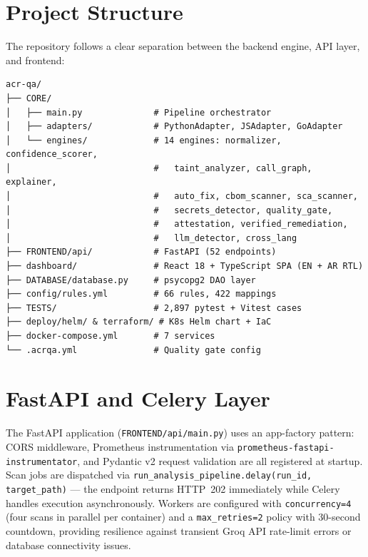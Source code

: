 \section{Project Structure}
\label{sec:project_structure}

The repository follows a clear separation between the backend engine, API layer, and frontend:

\begin{samepage}
\begin{lstlisting}[language={}, basicstyle=\footnotesize\ttfamily, caption={Repository Directory Structure (v5.0.0rc2)}]
acr-qa/
├── CORE/
│   ├── main.py              # Pipeline orchestrator
│   ├── adapters/            # PythonAdapter, JSAdapter, GoAdapter
│   └── engines/             # 14 engines: normalizer, confidence_scorer,
│                            #   taint_analyzer, call_graph, explainer,
│                            #   auto_fix, cbom_scanner, sca_scanner,
│                            #   secrets_detector, quality_gate,
│                            #   attestation, verified_remediation,
│                            #   llm_detector, cross_lang
├── FRONTEND/api/            # FastAPI (52 endpoints)
├── dashboard/               # React 18 + TypeScript SPA (EN + AR RTL)
├── DATABASE/database.py     # psycopg2 DAO layer
├── config/rules.yml         # 66 rules, 422 mappings
├── TESTS/                   # 2,897 pytest + Vitest cases
├── deploy/helm/ & terraform/ # K8s Helm chart + IaC
├── docker-compose.yml       # 7 services
└── .acrqa.yml               # Quality gate config
\end{lstlisting}
\end{samepage}


\section{FastAPI and Celery Layer}
\label{sec:fastapi_impl}

The FastAPI application \cite{fastapi_framework} (\texttt{FRONTEND/api/main.py}) uses an app-factory pattern: CORS middleware, Prometheus instrumentation via \texttt{prometheus-fastapi-instrumentator}, and Pydantic v2 request validation are all registered at startup. Scan jobs are dispatched via \texttt{run\_analysis\_pipeline.delay(run\_id, target\_path)} — the endpoint returns HTTP~202 immediately while Celery \cite{celery_project} handles execution asynchronously. Workers are configured with \texttt{concurrency=4} (four scans in parallel per container) and a \texttt{max\_retries=2} policy with 30-second countdown, providing resilience against transient Groq API rate-limit errors or database connectivity issues.

